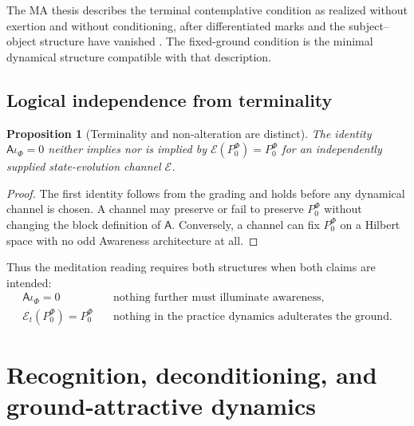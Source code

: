 \documentclass[11pt,reqno]{scrartcl}
\newcommand{\PzeroF}{P_{0}^{\Phi}}
\newcommand{\Aodd}{\mathsf A}
\newcommand{\iF}{\iota_{\Phi}}
\theoremstyle{plain}
\newtheorem{proposition}[proposition]{Proposition}
\theoremstyle{definition}
\theoremstyle{remark}
\begin{document}
The MA thesis describes the terminal contemplative condition as realized
without exertion and without conditioning, after differentiated marks and the
subject--object structure have vanished \cite[pp.~184--185]{Yiannopoulos2012}.
The fixed-ground condition is the minimal dynamical structure compatible with
that description.

\subsection{Logical independence from terminality}

\begin{proposition}[Terminality and non-alteration are distinct]
\label{prop:terminality-nonalteration-distinct}
The identity $\Aodd\iF=0$ neither implies nor is implied by
$\mathcal E(\PzeroF)=\PzeroF$ for an independently supplied state-evolution
channel $\mathcal E$.
\end{proposition}

\begin{proof}
The first identity follows from the grading and holds before any dynamical
channel is chosen.  A channel may preserve or fail to preserve $\PzeroF$
without changing the block definition of $\Aodd$.  Conversely, a channel can
fix $\PzeroF$ on a Hilbert space with no odd Awareness architecture at all.
\end{proof}

Thus the meditation reading requires both structures when both claims are
intended:
\begin{equation}
  \boxed{
  \begin{aligned}
  \Aodd\iF=0
  &\quad\text{nothing further must illuminate awareness},\\
  \mathcal E_t(\PzeroF)=\PzeroF
  &\quad\text{nothing in the practice dynamics adulterates the ground}.
  \end{aligned}}
  \label{eq:terminality-versus-nonalteration-box}
\end{equation}
\section{Recognition, deconditioning, and ground-attractive dynamics}
\label{sec:deconditioning-dynamics}
\end{document}
